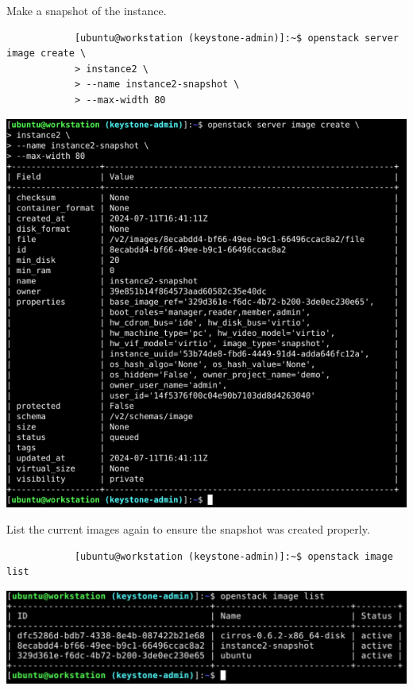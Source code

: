 \documentclass[letterpaper, 12pt]{article}
\begin{document}
\begin{enumerate}
    \begin{labstep}
        Make a snapshot of the instance.
        \begin{lstlisting}
            [ubuntu@workstation (keystone-admin)]:~$ openstack server image create \
            > instance2 \
            > --name instance2-snapshot \
            > --max-width 80
        \end{lstlisting}

        \begin{center}
            \includegraphics[width=\linewidth]{images/part2/step10.png}
        \end{center}
    \end{labstep}

    \begin{labstep}
        List the current images again to ensure the snapshot was created properly.
        \begin{lstlisting}
            [ubuntu@workstation (keystone-admin)]:~$ openstack image list
        \end{lstlisting}

        \begin{center}
            \includegraphics[width=\linewidth]{images/part2/step11.png}
        \end{center}
    \end{labstep}


\end{enumerate}
\end{document}
